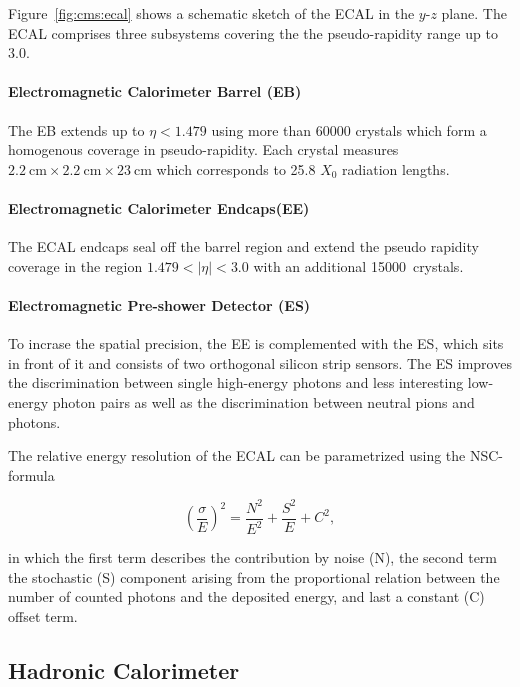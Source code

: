 Figure~\ref{fig:cms:ecal} shows a schematic sketch of the ECAL in the $y$-$z$
plane. The ECAL comprises three subsystems covering the the pseudo-rapidity
range up to 3.0. 

\paragraph{Electromagnetic Calorimeter Barrel (EB)} 
The EB extends up to $\eta < 1.479$ using more than \num{60000} crystals which form a
homogenous coverage in pseudo-rapidity. Each crystal measures
$\SI{2.2}{\centi\meter} \times \SI{2.2}{\centi\meter} \times
\SI{23}{\centi\meter}$ which corresponds to 25.8 $X_0$ radiation lengths.

\paragraph{Electromagnetic Calorimeter Endcaps(EE)} 
The ECAL endcaps seal off the barrel region and extend the pseudo rapidity
coverage in the region $1.479 < |\eta| < 3.0$ with an additional \SI{15000}
crystals.

\paragraph{Electromagnetic Pre-shower Detector (ES)} 
To incrase the spatial precision, the EE is complemented with the ES, which sits
in front of it and consists of two orthogonal silicon strip sensors. The ES
improves the discrimination between single high-energy photons and less
interesting low-energy photon pairs as well as the discrimination between
neutral pions and photons.

The relative energy resolution of the ECAL can be parametrized using the NSC-formula

\begin{equation*}
    \left( \frac{\sigma}{E} \right)^2 = \frac{N^2}{E^2} + \frac{S^2}{E} + C^2,
\end{equation*}

in which the first term describes the contribution by noise (N), the second
term the stochastic (S) component arising from the proportional relation between
the number of counted photons and the deposited energy, and last a constant (C)
offset term.

\subsection{Hadronic Calorimeter}

